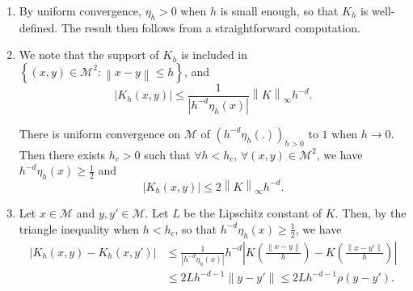 \documentclass[10pt,a4paper]{article}
\newcommand\cM{\mathcal{M}}
\newcommand\dR{\mathbb{R}}
\newcommand\dd{\mathrm{d}}
\newcommand{\ABS}[1]{{{\left| #1 \right|}}} %
\newcommand{\BRA}[1]{{{\left\{#1\right\}}}} %
\newcommand{\NRM}[1]{{{\left\| #1\right\|}}} %
\newcommand{\PAR}[1]{{{\left(#1\right)}}} %
\begin{document}
\begin{enumerate}[label=(\roman*)]
By the dominated convergence theorem, we deduce that, when $h\to 0$, $\PAR{h^{-d}\eta_h}_{h>0}$ converges to $\int_{\dR^d}K(\NRM{v})\dd v=1$, uniformly on $\cM$.

\item By uniform convergence, $\eta_h>0$ when $h$ is small enough, so that $K_h$ is well-defined. The result then follows from a straightforward computation. %



\item  We note that the support of $K_h$ is included in $\BRA{(x,y)\in\cM^2:\NRM{x-y}\le h}$, and
\[
\ABS{K_h(x,y)}
\le  \frac{1}{\ABS{h^{-d}\eta_h(x)}}\NRM{K}_\infty h^{-d}.
\]


There is uniform convergence on $\cM$ of $(h^{-d}\eta_h(.))_{h>0}$ to $1$ when $h\to 0$.
Then there exists $ h_c>0$ such that $\forall h< h_c$, $\forall (x,y)\in \cM^2$, we have $h^{-d}\eta_h(x)\ge \frac{1}{2}$ and 
\[
\ABS{K_h(x,y)}
\le  2\NRM{K}_\infty h^{-d}.
\]


\item Let $x\in \cM$ and $y,y'\in \cM$. Let $L$ be the Lipschitz constant of $K$. Then, by the triangle inequality when $h<h_c$, so that  $h^{-d}\eta_h(x)\ge \frac{1}{2}$, we have
\begin{align*}
    |K_h(x,y)-K_h(x,y')|&\le \frac{1}{\ABS{h^{-d}\eta_h(x)}} h^{-d} |K\PAR{\frac{\NRM{x-y}}{h}}-K\PAR{\frac{\NRM{x-y'}}{h}}|\\
    &\le  2Lh^{-d-1}\|y-y'\| \le 2Lh^{-d-1}\rho(y-y').
\end{align*}
\end{enumerate}
 
\end{document}
